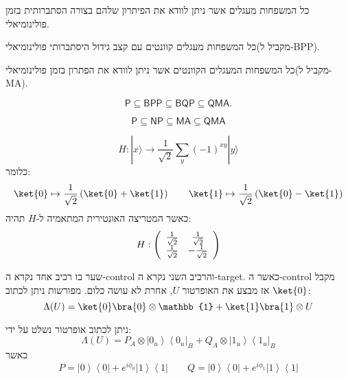 \documentclass{tstextbook}
\begin{document}
\begin{definition}[מחלקת MA]
כל המשפחות מעגלים אשר ניתן לוודא את הפיתרון שלהם בצורה הסתברותית בזמן פולינומיאלי.

\end{definition}
\begin{definition}
כל המשפחות מעגלים קוונטים עם קצב גידול היסתברותי פולינומיאלי(מקביל ל-BPP).

\end{definition}
\begin{definition}
כל המשפחות המעגלים הקוונטים אשר ניתן לוודא את הפתרון בזמן פולינומיאלי(מקביל ל-MA).

\end{definition}
\begin{proposition}
$$\mathsf{P}\subseteq{\mathsf{BPP}}\subseteq{\mathsf{BQP}}\subseteq{\mathsf{QMA}}.$$

\end{proposition}
\begin{proposition}
$${\mathsf{P}}\subseteq{\mathsf{N P}}\subseteq{\mathsf{M A}}\subseteq{\mathsf{Q M A}}$$

\end{proposition}
\begin{definition}
$$H:|x\rangle\to\frac{1}{\sqrt{2}}\sum_{y}(-1)^{x y}|y\rangle$$
כלומר:
$$\ket{0} \mapsto \frac{1}{\sqrt{ 2 }}\left( \ket{0} +\ket{1}  \right)\qquad \ket{1} \mapsto \frac{1}{\sqrt{ 2 }}\left( \ket{0} -\ket{1}  \right)$$
כאשר המטריצה האונטירית המתאמיה ל-\(H\) תהיה:
$$H:\left(\begin{array}{c  c}{{\frac{1}{\sqrt{2}}}}&{{\frac{1}{\sqrt{2}}}}\\ {{\frac{1}{\sqrt{2}}}}&{{-\frac{1}{\sqrt{2}}}}\end{array}\right)$$

\end{definition}
\begin{definition}
שער בו רכיב אחד נקרא ה-control והרכיב השני נקרא ה-target. כאשר ה-control מקבל \(\ket{0}\) אז מבצע את האופרטור \(U\), אחרת לא עושה כלום. מפורשות ניתן לכתוב:
$$\Lambda (U)=\ket{0} \bra{0} \otimes \mathbb{1} +\ket{1} \bra{1} \otimes U $$

\end{definition}
\begin{proposition}
ניתן לכתוב אופרטור נשלט על ידי:
$$\Lambda\left(U\right)=P_{A}\otimes\left|0_{u}\right\rangle\left\langle0_{u}\right|_{B}+Q_{A}\otimes\left|1_{u}\right\rangle\left\langle1_{u}\right|_{B}$$
כאשר
$$P=\left|0\right\rangle\left\langle0\right|+e^{i\phi_{0}}\left|1\right\rangle\left\langle1\right|\qquad Q=\left|0\right\rangle\left\langle0\right|+e^{i\phi_{1}}\left|1\right\rangle\left\langle1\right|$$

\end{proposition}
\end{document}
